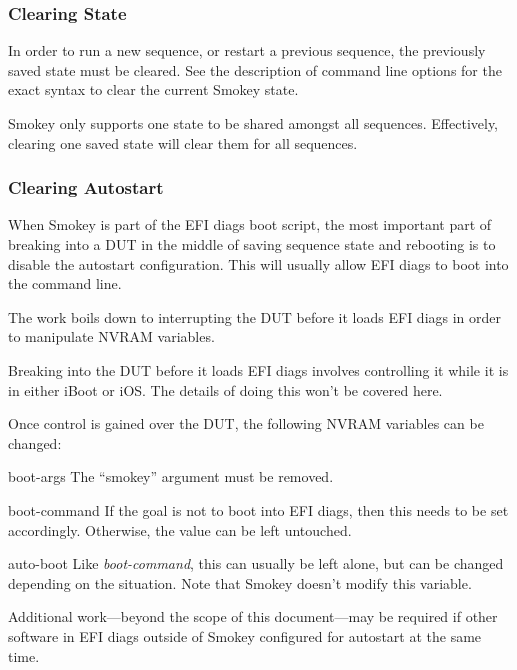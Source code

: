 \documentclass[11pt]{article}
\newcommand{\nvram}[1]{\mbox{\itshape#1}}
\newcommand{\nvarg}[1]{\mbox{``#1''}}
\begin{document}
\subsubsection{Clearing State}

In order to run a new sequence, or restart a previous sequence, the previously
saved state must be cleared.  See the description of command line options for
the exact syntax to clear the current Smokey state.

Smokey only supports one state to be shared amongst all sequences.
Effectively, clearing one saved state will clear them for all sequences.

\subsubsection{Clearing Autostart}

When Smokey is part of the EFI diags boot script, the most important part of
breaking into a DUT in the middle of saving sequence state and rebooting is to
disable the autostart configuration.  This will usually allow EFI diags to boot
into the command line.

The work boils down to interrupting the DUT before it loads EFI diags in order
to manipulate NVRAM variables.

Breaking into the DUT before it loads EFI diags involves controlling it while
it is in either iBoot or iOS.  The details of doing this won't be covered here.

Once control is gained over the DUT, the following NVRAM variables can be
changed:

\begin{Definition}

\item[boot-args] The \nvarg{smokey} argument must be removed.

\item[boot-command] If the goal is not to boot into EFI diags, then this needs to be set accordingly.  Otherwise, the value can be left untouched.

\item[auto-boot] Like \nvram{boot-command}, this can usually be left alone, but can be changed depending on the situation.  Note that Smokey doesn't modify this variable.

\end{Definition}

Additional work---beyond the scope of this document---may be required if other
software in EFI diags outside of Smokey configured for autostart at the same
time.
\end{document}

